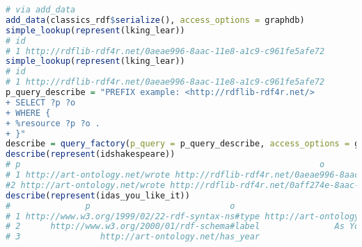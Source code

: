 \begin{lstlisting}[language=R,
label=listing:rdf-3,
basicstyle=\ttfamily\scriptsize, caption=Creating RDF]
# via add_data
add_data(classics_rdf$serialize(), access_options = graphdb)
simple_lookup(represent(lking_lear))
# id
# 1 http://rdflib-rdf4r.net/0aeae996-8aac-11e8-a1c9-c961fe5afe72
simple_lookup(represent(lking_lear))
# id
# 1 http://rdflib-rdf4r.net/0aeae996-8aac-11e8-a1c9-c961fe5afe72
p_query_describe = "PREFIX example: <http://rdflib-rdf4r.net/>
+ SELECT ?p ?o
+ WHERE {
+ %resource ?p ?o .
+ }"
describe = query_factory(p_query = p_query_describe, access_options = graphdb)
describe(represent(idshakespeare))
# p                                                            o
# 1 http://art-ontology.net/wrote http://rdflib-rdf4r.net/0aeae996-8aac-11e8-a1c9-c961fe5afe72
#2 http://art-ontology.net/wrote http://rdflib-rdf4r.net/0aff274e-8aac-11e8-a1c9-c961fe5afe72
describe(represent(idas_you_like_it))
#               p                            o
# 1 http://www.w3.org/1999/02/22-rdf-syntax-ns#type http://art-ontology.net/Play
# 2      http://www.w3.org/2000/01/rdf-schema#label               As You Like It
# 3                http://art-ontology.net/has_year                         1599
\end{lstlisting}